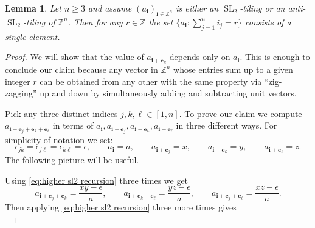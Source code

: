 \documentclass[12pt]{amsart}
\newtheorem{lemma}[theorem]{Lemma}
\newcommand{\be}{\boldsymbol{e}}
\newcommand{\bi}{\boldsymbol{i}}
\newcommand{\SL}{\operatorname{SL}}
\newcommand{\ZZ}{\mathbb{Z}}
\begin{document}
  \begin{lemma}\label{le:constant slices}
    Let $n\ge 3$ and assume $(a_{\bi})_{\bi\in\ZZ^n}$ is either an $\SL_2$-tiling or an anti-$\SL_2$-tiling of $\ZZ^n$.
    Then for any $r\in\ZZ$ the set $\{a_{\bi}: \sum_{j=1}^n i_j=r\}$ consists of a single element.
  \end{lemma}
  \begin{proof}
    We will show that the value of $a_{\bi+\be_k}$ depends only on $a_{\bi}$.
    This is enough to conclude our claim because any vector in $\ZZ^n$ whose entries sum up to a given integer $r$ can be obtained from any other with the same property via ``zig-zagging'' up and down by simultaneously adding and subtracting unit vectors.

    Pick any three distinct indices $j,k,\ell\in[1,n]$.
    To prove our claim we compute $a_{\bi+\be_j+\be_k+\be_\ell}$ in terms of $a_{\bi}, a_{\bi+\be_j}, a_{\bi+\be_k}, a_{\bi+\be_\ell}$ in three different ways.
    For simplicity of notation we set:
    \[
      \epsilon_{jk}=\epsilon_{j\ell}=\epsilon_{k\ell}=\epsilon,
      \quad\quad
      a_{\bi}=a,
      \quad\quad
      a_{\bi+\be_j}=x,
      \quad\quad
      a_{\bi+\be_k}=y,
      \quad\quad
      a_{\bi+\be_\ell}=z.
    \]
    The following picture will be useful.
    \begin{center}
    \end{center}
    Using \eqref{eq:higher sl2 recursion} three times we get
    \[
      a_{\bi+\be_j+\be_k}=\frac{xy-\epsilon}{a},
      \quad\quad
      a_{\bi+\be_k+\be_\ell}=\frac{yz-\epsilon}{a},
      \quad\quad
      a_{\bi+\be_j+\be_\ell}=\frac{xz-\epsilon}{a}.
    \]
    Then applying \eqref{eq:higher sl2 recursion} three more times gives
    \begin{equation*}

\end{equation*}
\end{proof}
\end{document}
